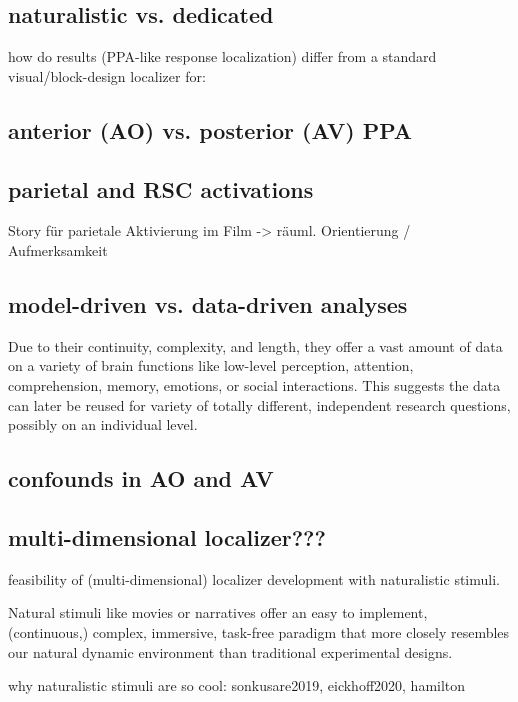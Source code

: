 \documentclass[english]{article}
\begin{document}
\subsection{naturalistic vs. dedicated} how do results (PPA-like response
localization) differ from a standard visual/block-design localizer for:

\subsection{anterior (AO) vs. posterior (AV) PPA}

\subsection{parietal and RSC activations} Story für parietale Aktivierung im
Film -> räuml. Orientierung / Aufmerksamkeit

\subsection{model-driven vs. data-driven analyses} Due to their continuity,
complexity, and length, they offer a vast amount of data on a variety of brain
functions like low-level perception, attention, comprehension, memory, emotions,
or social interactions. This suggests the data can later be reused for variety
of totally different, independent research questions, possibly on an individual
level.

\subsection{confounds in AO and AV}

\subsection{multi-dimensional localizer???}
feasibility of (multi-dimensional) localizer development with naturalistic
stimuli.

Natural stimuli like movies \citep{hasson2008neurocinematics,
sonkusare2019naturalistic} or narratives \citep{honey2012not,
lerner2011topographic, silbert2014coupled} offer an easy to implement,
(continuous,) complex, immersive, task-free paradigm that more closely resembles
our natural dynamic environment than traditional experimental designs.

why naturalistic stimuli are so cool: sonkusare2019, eickhoff2020, hamilton
\end{document}
